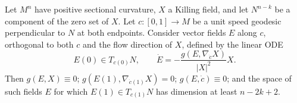 \begin{lemma}
  \label{lem:pet-ch8-jacobi-type-field}
  Let $M^n$ have positive sectional curvature, $X$ a Killing field, and let
  $N^{n-k}$ be a component of the zero set of $X$. Let $c:[0,1]\to M$ be a unit
  speed geodesic perpendicular to $N$ at both endpoints. Consider vector fields
  $E$ along $c$, orthogonal to both $c$ and the flow direction of $X$, defined
  by the linear ODE
  \[
    E(0)\in T_{c(0)}N,\qquad
    \dot E=-\frac{g(E,\nabla_{\dot c}X)}{|X|^2}X.
  \]
  Then $g(E,X)\equiv0$; $g(E(1),\nabla_{\dot c(1)}X)=0$; $g(E,\dot c)\equiv0$;
  and the space of such fields $E$ for which $E(1)\in T_{c(1)}N$ has dimension
  at least $n-2k+2$.
\end{lemma}
